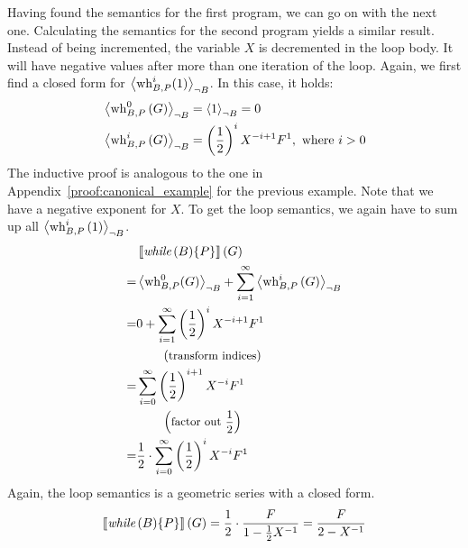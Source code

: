 Having found the semantics for the first program, we can go on with the next one.
Calculating the semantics for the second program yields a similar result.
Instead of being incremented, the variable $X$ is decremented in the loop body.
It will have negative values after more than one iteration of the loop.
Again, we first find a closed form for $\left\langle \operatorname{wh}_{B, P}^i(1) \right\rangle_{\lnot B}$.
In this case, it holds:
\begin{align*}
	& \left\langle \operatorname{wh}_{B, P}^0 \left( G \right) \right\rangle_{\lnot B} = \left\langle 1 \right\rangle_{\lnot B} = 0 \\
	& \left\langle \operatorname{wh}_{B, P}^i \left( G \right) \right\rangle_{\lnot B} = \left( \frac{1}{2} \right)^i X^{-i+1} F^1 , \text{ where } i > 0
\end{align*}
The inductive proof is analogous to the one in Appendix~\ref{proof:canonical_example} for the previous example.
Note that we have a negative exponent for $X$.
To get the loop semantics, we again have to sum up all $\left\langle  \operatorname{wh}_{B, P}^i \left(1\right)  \right\rangle_{\lnot B}$.
\begin{align*}
	 & \left\llbracket \textit{while}\,(B) \{P\} \right\rrbracket(G) \\
	=& \left\langle \operatorname{wh}_{B, P}^0(G) \right\rangle_{\lnot B} + \sum_{i = 1}^{\infty} \left\langle \operatorname{wh}_{B, P}^i \left(G\right) \right\rangle_{\lnot B} \\
	=& 0 + \sum_{i = 1}^{\infty} \left( \frac{1}{2} \right)^i X^{-i+1} F^1 \\
	 & \hspace*{2em} \left(\text{\small transform indices}\right) \\
	=& \sum_{i = 0}^{\infty} \left( \frac{1}{2} \right)^{i+1} X^{-i} F^1 \\
	 & \hspace*{2em} \left(\text{\small factor out $\frac{1}{2}$}\right) \\
	=& \frac{1}{2} \cdot \sum_{i = 0}^{\infty} \left( \frac{1}{2} \right)^i X^{-i} F^1
\end{align*}
Again, the loop semantics is a geometric series with a closed form.
\[ \left\llbracket \textit{while}\,(B) \{P\} \right\rrbracket(G) = \frac{1}{2} \cdot \frac{F}{1 - \frac{1}{2} X^{-1}} = \frac{F}{2 - X^{-1}} \]


